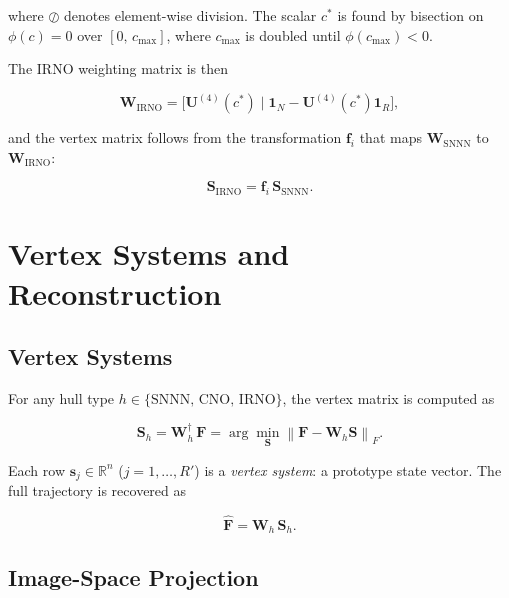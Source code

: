 \documentclass[11pt]{article}
\theoremstyle{definition}
\theoremstyle{plain}
\newcommand{\R}{\mathbb{R}}
\newcommand{\mat}[1]{\mathbf{#1}}
\newcommand{\norm}[1]{\left\|#1\right\|}
\newcommand{\pinv}[1]{#1^{\dagger}}
\newcommand{\ones}{\mathbf{1}}
\begin{document}
where $\oslash$ denotes element-wise division.  The scalar $c^*$ is
found by bisection on $\phi(c) = 0$ over $[0,\,c_{\max}]$, where
$c_{\max}$ is doubled until $\phi(c_{\max}) < 0$.

The IRNO weighting matrix is then

\begin{equation}
  \mat{W}_{\mathrm{IRNO}} = \bigl[\mat{U}^{(4)}(c^*)\;\big|\;
  \ones_N - \mat{U}^{(4)}(c^*)\ones_{R}\bigr],
  \label{eq:Wirno}
\end{equation}

and the vertex matrix follows from the transformation $\mat{f}_i$ that maps
$\mat{W}_{\mathrm{SNNN}}$ to $\mat{W}_{\mathrm{IRNO}}$:

\begin{equation}
  \mat{S}_{\mathrm{IRNO}} = \mat{f}_i\,\mat{S}_{\mathrm{SNNN}}.
  \label{eq:Sirno}
\end{equation}


\section{Vertex Systems and Reconstruction}

\subsection{Vertex Systems}

For any hull type $h \in \{\mathrm{SNNN},\,\mathrm{CNO},\,\mathrm{IRNO}\}$,
the vertex matrix is computed as

\begin{equation}
  \mat{S}_h = \pinv{\mat{W}_h}\,\mat{F}
  = \arg\min_{\mat{S}}\norm{\mat{F} - \mat{W}_h\mat{S}}_F.
  \label{eq:vertex}
\end{equation}

Each row $\mat{s}_j \in \R^n$ ($j = 1,\ldots,R'$) is a \emph{vertex
system}: a prototype state vector.  The full trajectory is recovered as

\begin{equation}
  \hat{\mat{F}} = \mat{W}_h\,\mat{S}_h.
  \label{eq:recon}
\end{equation}

\subsection{Image-Space Projection}
\end{document}

